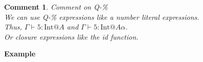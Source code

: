 \documentclass[9pt, a4paper]{extarticle}
\theoremstyle{break}
\newtheorem{cm}{Comment}
\newif\iffullversion
\newcommand{\figheader}[2]{
  \begin{flushleft}
    #2 {\bf \normalsize #1}
\end{flushleft}}
\newcommand{\G}{\Gamma}
\newcommand{\V}{\vdash}
\newcommand{\E}{\equiv}
\begin{document}
\begin{cm}{Comment on \textsc{Q-\%}\\}
    We can use \textsc{Q-\%} expressions like a number literal expressions.\\
    Thus, $\G\V 5 :\text{Int} @A$ and $\G\V 5 : \text{Int} @ A\alpha$.\\
    Or closure expressions like the id function.\\
 \end{cm}


\figheader{Example}{}

\iffullversion
\end{document}

